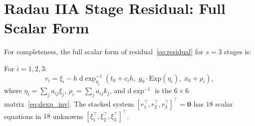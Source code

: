 \documentclass[a4paper,10pt]{article}
\newcommand{\Exp}{\mathrm{Exp}}
\newcommand{\dexp}{\mathrm{d}\exp}
\theoremstyle{definition}
\begin{document}
\section{Radau IIA Stage Residual: Full Scalar Form}
\label{app:residual_scalar}

For completeness, the full scalar form of residual~\eqref{eq:residual} for
$s = 3$ stages is:

For $i = 1,2,3$:
\begin{equation}
  r_i = \xi_i - h\;\dexp^{-1}_{\eta_i}(t_0 + c_i h,\; g_0 \cdot \Exp(\eta_i),\; x_0 + \rho_i),
\end{equation}
where $\eta_i = \sum_j a_{ij}\xi_j$, $\rho_i = \sum_j a_{ij} k_j$, and
$\dexp^{-1}$ is the $6\times6$ matrix~\eqref{eq:dexp_inv}.  The stacked
system $[r_1^\top, r_2^\top, r_3^\top]^\top = \mathbf{0}$ has $18$ scalar
equations in $18$ unknowns $[\xi_1^\top, \xi_2^\top, \xi_3^\top]^\top$.
\end{document}
